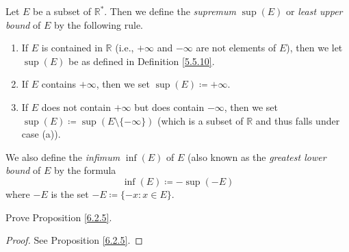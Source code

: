 \begin{definition}\label{6.2.6}
Let \(E\) be a subset of \(\mathds{R}^*\).
Then we define the \emph{supremum} \(\sup(E)\) or \emph{least upper bound} of \(E\) by the following rule.
\begin{enumerate}
    \item If \(E\) is contained in \(\mathds{R}\) (i.e., \(+\infty\) and \(-\infty\) are not elements of \(E\)), then we let \(\sup(E)\) be as defined in Definition \ref{5.5.10}.
    \item If \(E\) contains \(+\infty\), then we set \(\sup(E) \coloneqq +\infty\).
    \item If \(E\) does not contain \(+\infty\) but does contain \(-\infty\), then we set \(\sup(E) \coloneqq \sup(E \setminus \{-\infty\})\)
    (which is a subset of \(\mathds{R}\) and thus falls under case (a)).
\end{enumerate}
We also define the \emph{infimum} \(\inf(E)\) of \(E\) (also known as the \emph{greatest lower bound} of \(E\) by the formula
\[
    \inf(E) \coloneqq -\sup(-E)
\]
where \(-E\) is the set \(-E \coloneqq \{-x : x \in E\}\).
\end{definition}

\exercisesection

\begin{exercise}\label{ex 6.2.1}
Prove Proposition \ref{6.2.5}.
\end{exercise}

\begin{proof}
See Proposition \ref{6.2.5}.
\end{proof}